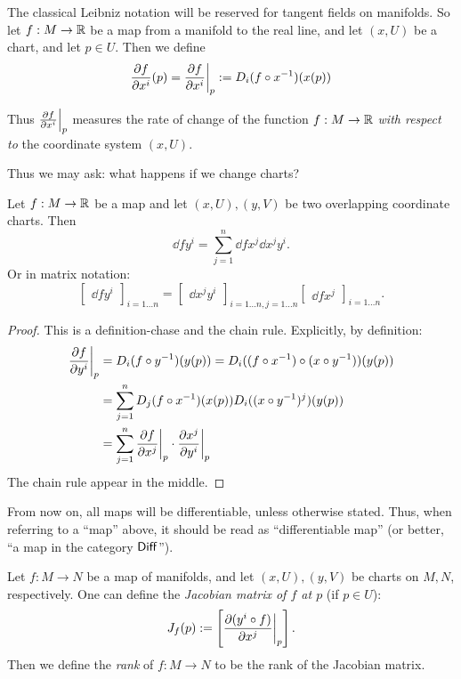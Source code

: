 \documentclass[11pt, english]{article}
\begin{document}
The classical Leibniz notation will be reserved for tangent fields on manifolds. So let $f:M \to \mathbb{R}$ be a map from a manifold to the real line, and let $(x,U)$ be a chart, and let $p \in U$. Then we define
\[
\frac{\partial f}{\partial  x^i} (p) = \restr{\frac{\partial f}{\partial x^i}}p := D_i(f \circ x^{-1})(x(p))
\]

Thus $\restr{\frac{\partial f}{\partial x^i}}p$ measures the rate of change of the function $f:M \to \mathbb{R}$ \emph{with respect to} the coordinate system $(x,U)$.

Thus we may ask: what happens if we change charts?
\begin{prop}
Let $f:M \to \mathbb{R}$ be a map and let $(x,U),(y,V)$ be two overlapping coordinate charts. Then
\[
\dd{f}{y^i} = \sum_{j=1}^n \dd f{x^j} \dd{x^j}{y^i}.
\]
Or in matrix notation:
\[
\begin{bmatrix}
\dd f{y^i}
\end{bmatrix}_{i=1\dotsc n} = \begin{bmatrix} \dd{x^j}{y^i} \end{bmatrix}_{i=1\dotsc n, j=1\dotsc n} \begin{bmatrix} \dd f {x^j} \end{bmatrix}_{i=1 \dotsc n}.
\]
\end{prop}
\begin{proof}
This is a definition-chase and the chain rule. Explicitly, by definition:
\begin{align*}
 \restr{\dd{f}{y^i}}{p} &= D_i(f \circ y^{-1})(y(p)) = D_i((f \circ x^{-1}) \circ (x \circ y^{-1}))(y(p)) \\
&= \sum
_{j=1}^n D_j(f \circ x^{-1})(x(p)) D_i((x \circ y^{-1})^j)(y(p)) \\
&= \sum_{j=1}^n \restr{\dd{f}{x^j}}{p} \cdot  \restr{\dd{x^j}{y^i}}{p}
\end{align*}
The chain rule appear in the middle.
\end{proof}
\begin{remark}
From now on, all maps will be differentiable, unless otherwise stated. Thus, when referring to a ``map'' above, it should be read as ``differentiable map'' (or better, ``a map in the category $\mathsf{Diff}$'').
\end{remark}

Let $f:M \to N$ be a map of manifolds, and let $(x,U),(y,V)$ be charts on $M,N$, respectively. One can define the \emph{Jacobian matrix of $f$ at $p$} (if $p \in U$):
\[
J_f(p) := \left[ \restr{\dd{(y^i \circ f)}{x^j}}p \right].
\]
Then we define the \emph{rank} of $f:M \to N$ to be the rank of the Jacobian matrix.
\end{document}
